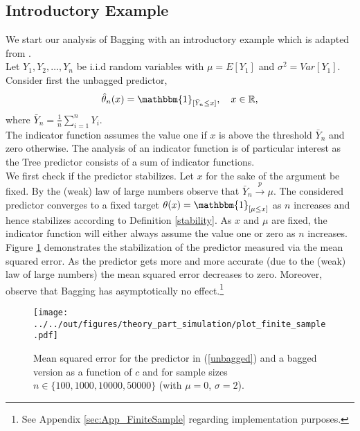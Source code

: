 \subsection{Introductory Example}\label{introductionbagging}
We start our analysis of Bagging with an introductory example which is adapted from \cite{Buhlmann2002}. \\
Let $Y_{1}, Y_{2}, \dots, Y_{n}$ be i.i.d random variables with $\mu = E[Y_{1}]$ and $\sigma^{2} = Var[Y_{1}]$. Consider first the unbagged predictor,
\begin{equation}\label{unbagged}
\hat{\theta}_{n}(x) = \mathbbm{1}_{[\bar{Y}_{n} \leq x]},\quad x\in  \mathbb{R},
\end{equation}
where $\bar{Y}_{n} = \frac{1}{n}\sum_{i=1}^{n}Y_{i}.$ \\
The indicator function assumes the value one if $x$ is above the threshold $\bar{Y}_n$ and zero otherwise. The analysis of an indicator function is of particular interest as the Tree predictor consists of a sum of indicator functions.\\
We first check if the predictor stabilizes.
Let $x$ for the sake of the argument be fixed.
By the (weak) law of large numbers observe that $\bar{Y}_{n}\xrightarrow{p} \mu.$
The considered predictor converges to a fixed target $\theta(x)=\mathbbm{1}_{[\mu \leq x]}$ as $n$ increases and hence stabilizes according to Definition \ref{stability}.
As $x$ and $\mu$ are fixed, the indicator function will either always assume the value one or zero as $n$ increases.\\
Figure \ref{plot_finite_sample} demonstrates the stabilization of the predictor measured via the mean squared error.
As the predictor gets more and more accurate (due to the (weak) law of large numbers) the mean squared error decreases to zero.
Moreover, observe that Bagging has asymptotically no effect.\footnote{See Appendix \ref{sec:App_FiniteSample} regarding implementation purposes.}
\begin{figure}[t]
\centering
\texttt{[image: ../../out/figures/theory\_part\_simulation/plot\_finite\_sample.pdf]}
\caption[Mean squared error for the predictor in (\ref{unbagged}) and a bagged version as a function of $c$ and for sample sizes $n \in \{100, 1000, 10000, 50000\}$ (with $\mu=0$, $\sigma =2$).]{Mean squared error for the predictor in (\ref{unbagged}) and a bagged version as a function of $c$ and for sample sizes $n \in \{100, 1000, 10000, 50000\}$ (with $\mu=0$, $\sigma =2$).}\label{plot_finite_sample}
\end{figure}
